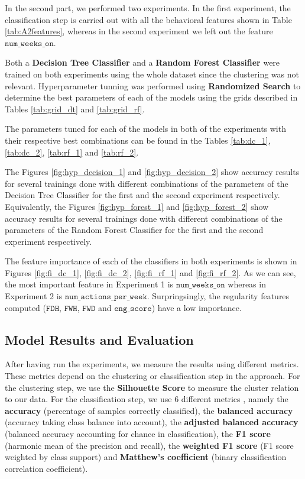 \documentclass[sigplan,screen]{acmart}
\begin{document}
In the second part, we performed two experiments. In the first experiment, the classification step is carried out with all the behavioral features shown in Table \ref{tab:A2features}, whereas in the second experiment we left out the feature $\texttt{num\_weeks\_on}$.

Both a \textbf{Decision Tree Classifier} and a \textbf{Random Forest Classifier} were trained on both experiments using the whole dataset since the clustering was not relevant. Hyperparameter tunning was performed using \textbf{Randomized Search} to determine the best parameters of each of the models using the grids described in Tables \ref{tab:grid_dt} and \ref{tab:grid_rf}.

The parameters tuned for each of the models in both of the experiments with their respective best combinations can be found in the Tables \ref{tab:dc_1}, \ref{tab:dc_2}, \ref{tab:rf_1} and \ref{tab:rf_2}.

The Figures \ref{fig:hyp_decision_1} and \ref{fig:hyp_decision_2} show accuracy results for several trainings done with different combinations of the parameters of the Decision Tree Classifier for the first and the second experiment respectively. Equivalently, the Figures \ref{fig:hyp_forest_1} and \ref{fig:hyp_forest_2} show accuracy results for several trainings done with different combinations of the parameters of the Random Forest Classifier for the first and the second experiment respectively.

The feature importance of each of the classifiers in both experiments is shown in Figures \ref{fig:fi_dc_1},
\ref{fig:fi_dc_2}, \ref{fig:fi_rf_1} and \ref{fig:fi_rf_2}. As we can see, the most important feature in Experiment 1 is $\texttt{num\_weeks\_on}$ whereas in Experiment 2 is $\texttt{num\_actions\_per\_week}$. Surpringsingly, the regularity features computed ($\texttt{FDH}$, $\texttt{FWH}$, $\texttt{FWD}$ and $\texttt{eng\_score}$) have a low importance.

\subsection{Model Results and Evaluation}\label{subsec:eval_results}

After having run the experiments, we measure the results using different metrics. These metrics depend on the clustering or classification step in the approach. For the clustering step, we use the \textbf{Silhouette Score} to measure the cluster relation to our data. For the classification step, we use 6 different metrics \cite{scikit-learn}, namely the \textbf{accuracy} (percentage of samples correctly classified), the \textbf{balanced accuracy} (accuracy taking class balance into account), the \textbf{adjusted balanced accuracy} (balanced accuracy accounting for chance in classification), the \textbf{F1 score} (harmonic mean of the precision and recall), the \textbf{weighted F1 score} (F1 score weighted by class support) and \textbf{Matthew's coefficient} (binary classification correlation coefficient).
\end{document}
